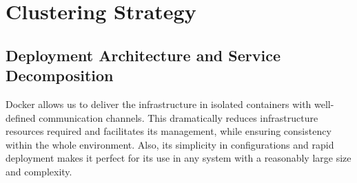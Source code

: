 \documentclass[12pt]{article}
\begin{document}




\newpage
\section{Clustering Strategy} \label{strategy} %

\subsection{Deployment Architecture and Service Decomposition} \label{strategy.architecture} %


Docker \cite{docker} allows us to deliver the infrastructure in isolated containers with well-defined communication channels.
This dramatically reduces infrastructure resources required and facilitates its management, while ensuring consistency within the whole environment.
Also, its simplicity in configurations and rapid deployment makes it perfect for its use in any system with a reasonably large size and complexity.
\end{document}
